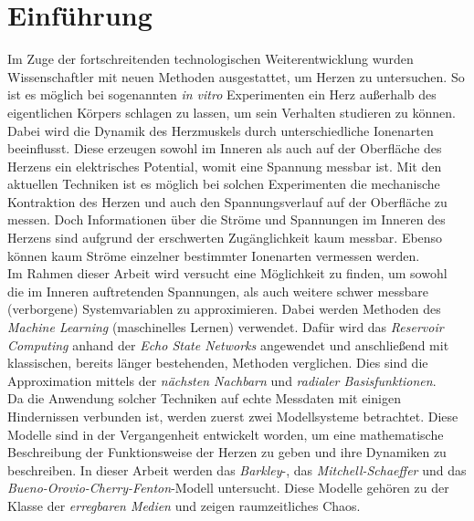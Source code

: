 \chapter{Einführung}
Im Zuge der fortschreitenden technologischen Weiterentwicklung wurden Wissenschaftler mit neuen Methoden ausgestattet, um Herzen zu untersuchen. So ist es möglich bei sogenannten \textit{in vitro} Experimenten ein Herz außerhalb des eigentlichen Körpers schlagen zu lassen, um sein Verhalten studieren zu können. Dabei wird die Dynamik des Herzmuskels durch unterschiedliche Ionenarten beeinflusst. Diese erzeugen sowohl im Inneren als auch auf der Oberfläche des Herzens ein elektrisches Potential, womit eine Spannung messbar ist. Mit den aktuellen Techniken ist es möglich bei solchen Experimenten die mechanische Kontraktion des Herzen und auch den Spannungsverlauf auf der Oberfläche zu messen. Doch Informationen über die Ströme und Spannungen im Inneren des Herzens sind aufgrund der erschwerten Zugänglichkeit kaum messbar. Ebenso können kaum Ströme einzelner bestimmter Ionenarten vermessen werden. \\

Im Rahmen dieser Arbeit wird versucht eine Möglichkeit zu finden, um sowohl die im Inneren auftretenden Spannungen, als auch weitere schwer messbare (verborgene) Systemvariablen zu approximieren. Dabei werden Methoden des \textit{Machine Learning} (maschinelles Lernen) verwendet. Dafür wird das \textit{Reservoir Computing} anhand der \textit{Echo State Networks} angewendet und anschließend mit klassischen, bereits länger bestehenden, Methoden verglichen. Dies sind die Approximation mittels der \textit{nächsten Nachbarn} und \textit{radialer Basisfunktionen}.\\
  
Da die Anwendung solcher Techniken auf echte Messdaten mit einigen Hindernissen verbunden ist, werden zuerst zwei Modellsysteme betrachtet. Diese Modelle sind in der Vergangenheit entwickelt worden, um eine mathematische Beschreibung der Funktionsweise der Herzen zu geben und ihre Dynamiken zu beschreiben. In dieser Arbeit werden das \textit{Barkley}-, das \textit{Mitchell-Schaeffer} und das \textit{Bueno-Orovio-Cherry-Fenton}-Modell untersucht. Diese Modelle gehören zu der Klasse der \textit{erregbaren Medien} und zeigen raumzeitliches Chaos.\\

